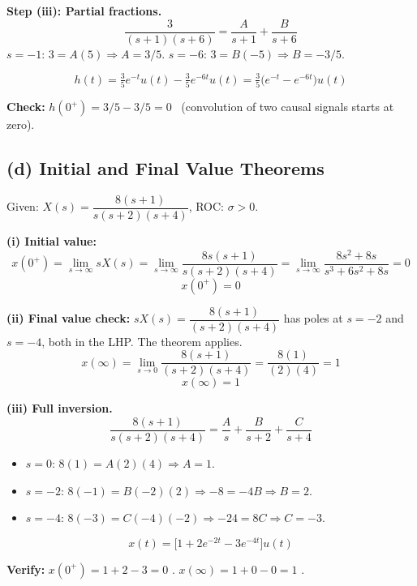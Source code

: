 \documentclass[11pt]{article}
\begin{document}
\textbf{Step (iii): Partial fractions.}
\[
\frac{3}{(s+1)(s+6)} = \frac{A}{s+1} + \frac{B}{s+6}
\]
$s=-1$: $3 = A(5) \Rightarrow A = 3/5$. \quad
$s=-6$: $3 = B(-5) \Rightarrow B = -3/5$.

\begin{equation*}
\boxed{h(t) = \tfrac{3}{5}e^{-t}u(t) - \tfrac{3}{5}e^{-6t}u(t) = \tfrac{3}{5}\bigl(e^{-t} - e^{-6t}\bigr)u(t)}
\end{equation*}

\textbf{Check:} $h(0^+) = 3/5 - 3/5 = 0$ \checkmark\ (convolution of two causal signals starts at zero).

\subsection*{(d) Initial and Final Value Theorems}

Given: $X(s) = \dfrac{8(s+1)}{s(s+2)(s+4)}$, ROC: $\sigma > 0$.

\textbf{(i) Initial value:}
\[
x(0^+) = \lim_{s\to\infty} sX(s) = \lim_{s\to\infty}\frac{8s(s+1)}{s(s+2)(s+4)}
= \lim_{s\to\infty}\frac{8s^2+8s}{s^3+6s^2+8s} = 0
\]
\begin{equation*}
\boxed{x(0^+) = 0}
\end{equation*}

\textbf{(ii) Final value check:} $sX(s) = \dfrac{8(s+1)}{(s+2)(s+4)}$ has poles at $s=-2$ and
$s=-4$, both in the LHP. The theorem applies. \checkmark
\[
x(\infty) = \lim_{s\to 0}\frac{8(s+1)}{(s+2)(s+4)} = \frac{8(1)}{(2)(4)} = 1
\]
\begin{equation*}
\boxed{x(\infty) = 1}
\end{equation*}

\textbf{(iii) Full inversion.}
\[
\frac{8(s+1)}{s(s+2)(s+4)} = \frac{A}{s} + \frac{B}{s+2} + \frac{C}{s+4}
\]
\begin{itemize}[leftmargin=2em]
\item $s= 0$: $8(1)  = A(2)(4) \Rightarrow A = 1$.
\item $s=-2$: $8(-1) = B(-2)(2) \Rightarrow -8 = -4B \Rightarrow B = 2$.
\item $s=-4$: $8(-3) = C(-4)(-2) \Rightarrow -24 = 8C \Rightarrow C = -3$.
\end{itemize}

\begin{equation*}
\boxed{x(t) = \bigl[1 + 2 e^{-2t} - 3 e^{-4t}\bigr]u(t)}
\end{equation*}

\textbf{Verify:} $x(0^+) = 1 + 2 - 3 = 0$ \checkmark. \quad $x(\infty) = 1 + 0 - 0 = 1$ \checkmark.
\end{document}
